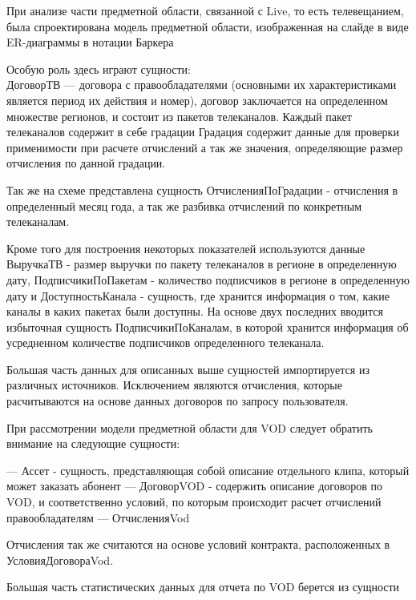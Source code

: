 \documentclass[a4paper]{article}
\begin{document}
\newpage

При анализе части предметной области, связанной с Live, то есть телевещанием, была спроектирована модель предметной области, изображенная на слайде в виде
ER-диаграммы в нотации Баркера

Особую роль здесь играют сущности:\\

ДоговорТВ --- договора с правообладателями (основными их характеристиками является период их действия и номер), договор заключается на определенном множестве регионов, и состоит из пакетов телеканалов.
Каждый пакет телеканалов содержит в себе градации
Градация содержит данные для проверки применимости при расчете отчислений а так же значения, определяющие размер отчисления по данной градации.

Так же на схеме представлена сущность ОтчисленияПоГрадации - отчисления в определенный месяц года, а так же разбивка отчислений по конкретным телеканалам.

\newpage

Кроме того для построения некоторых показателей используются данные ВыручкаТВ - размер выручки по пакету телеканалов в регионе в определенную дату, ПодписчикиПоПакетам - количество подписчиков в регионе в определенную дату и ДоступностьКанала - сущность, где хранится информация о том, какие каналы в каких пакетах были доступны.
На основе двух последних вводится избыточная сущность ПодписчикиПоКаналам, в которой хранится информация об усредненном количестве подписчиков определенного телеканала.

Большая часть данных для описанных выше сущностей импортируется из различных источников.
Исключением являются отчисления, которые расчитываются на основе данных договоров по запросу пользователя.


\newpage

При рассмотрении модели предметной области для VOD следует обратить внимание на следующие сущности:

--- Ассет - сущность, представляющая собой описание отдельного клипа, который может заказать абонент
--- ДоговорVOD - содержить описание договоров по VOD, и соответственно условий, по которым происходит расчет отчислений правообладателям --- ОтчисленияVod

Отчисления так же считаются на основе условий контракта, расположенных в УсловияДоговораVod.

\newpage

Большая часть статистических данных для отчета по VOD берется из сущности
\end{document}
